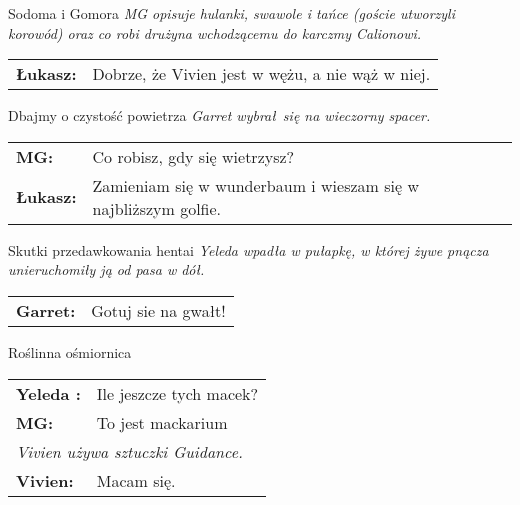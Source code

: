 \documentclass[10pt,twoside,twocolumn]{book}
\begin{document}
\begin{rpg-quotebox}{Sodoma i Gomora}
   \textit{MG opisuje hulanki, swawole i tańce (goście utworzyli korowód) oraz co robi drużyna wchodzącemu do karczmy Calionowi.}\\
   
   \begin{tabularx}{\columnwidth}{lX}
      \textbf{Łukasz:} & Dobrze, że Vivien jest w wężu, a nie wąż w niej. \\
   \end{tabularx}
\end{rpg-quotebox}


\begin{rpg-quotebox}{Dbajmy o czystość powietrza}
   \textit{Garret wybrał się na wieczorny spacer.}\\
   
   \begin{tabularx}{\columnwidth}{lX}
      \textbf{MG:} & Co robisz, gdy się wietrzysz?\\
      \textbf{Łukasz:} & Zamieniam się w wunderbaum i wieszam się w najbliższym golfie. \\
   \end{tabularx}
\end{rpg-quotebox}


\begin{rpg-quotebox}{Skutki przedawkowania hentai}
   \textit{Yeleda wpadła w pułapkę, w której żywe pnącza unieruchomiły ją od pasa w dół.}\\
   
   \begin{tabularx}{\columnwidth}{lX}
      \textbf{Garret:} & Gotuj sie na gwałt! \\
   \end{tabularx}
\end{rpg-quotebox}


\begin{rpg-quotebox}{Roślinna ośmiornica}
   \begin{tabularx}{\columnwidth}{lX}
      \textbf{Yeleda :} & Ile jeszcze tych macek?\\
      \textbf{MG:} & To jest mackarium\\
      \multicolumn{2}{l}{\textit{Vivien używa sztuczki Guidance.}}\\
      \textbf{Vivien:} & Macam się.\\
   \end{tabularx}
\end{rpg-quotebox}
\end{document}
